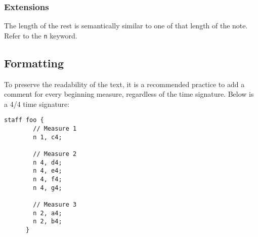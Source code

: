 \subsubsection{Extensions}

\np The length of the rest is semantically similar to one of that length
of the note. Refer to the \verb+n+ keyword.

\subsection{Formatting}
\label{formatting}
\np To preserve the readability of the text, it is a recommended practice to add a comment for every
beginning measure, regardless of the time signature. Below is a 4/4 time signature:
\begin{Verbatim}[frame=single]
      staff foo {
        // Measure 1
        n 1, c4;
  
        // Measure 2
        n 4, d4;
        n 4, e4;
        n 4, f4;
        n 4, g4;
  
        // Measure 3
        n 2, a4;
        n 2, b4;
      }
\end{Verbatim}

